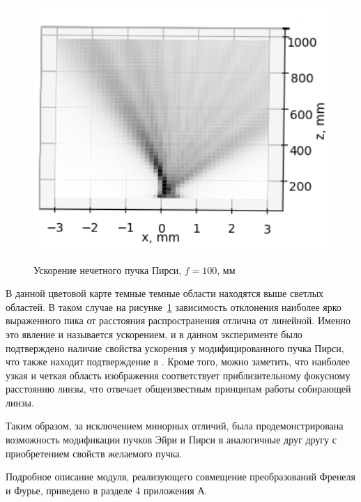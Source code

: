 {    \begin{figure}[H]
        \centering
        \includegraphics[height = 10cm]{plots/pe_acc_before_focus.png}
        \caption{Ускорение нечетного пучка Пирси, $f = 100$, мм}
        \label{correct_acc_peodd}
    \end{figure}

    В данной цветовой карте темные темные области находятся выше светлых областей.
    В таком случае на рисунке~\ref{correct_acc_peodd} зависимость отклонения наиболее ярко
    выраженного пика от расстояния распространения отлична от линейной.
    Именно это явление и называется ускорением, и в данном эксперименте было подтверждено наличие свойства ускорения
    у модифицированного пучка Пирси, что также находит подтверждение в \cite{first_airy}.
    Кроме того, можно заметить, что наиболее узкая и четкая область изображения соответствует приблизительному
    фокусному расстоянию линзы, что отвечает общеизвестным принципам работы собирающей линзы.

    Таким образом, за исключением минорных отличий, была продемонстрирована возможность модификации пучков Эйри и
    Пирси в аналогичные друг другу с приобретением свойств желаемого пучка.

    Подробное описание модуля, реализующего совмещение преобразований Френеля и Фурье, приведено в разделе 4 приложения А.

    }
    \newpage
